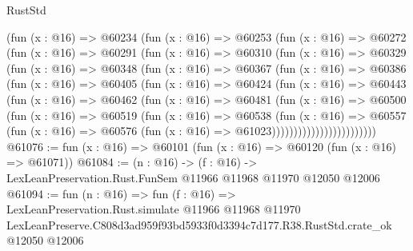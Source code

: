 \begin{lexlean}{RustStd}
\begin{coremodule}
            (fun (x : @16) =>
            @60234
              (fun (x : @16) =>
              @60253
                (fun (x : @16) =>
                @60272
                  (fun (x : @16) =>
                  @60291
                    (fun (x : @16) =>
                    @60310
                      (fun (x : @16) =>
                      @60329
                        (fun (x : @16) =>
                        @60348
                          (fun (x : @16) =>
                          @60367
                            (fun (x : @16) =>
                            @60386
                              (fun (x : @16) =>
                              @60405
                                (fun (x : @16) =>
                                @60424
                                  (fun (x : @16) =>
                                  @60443
                                    (fun (x : @16) =>
                                    @60462
                                      (fun (x : @16) =>
                                      @60481
                                        (fun (x : @16) =>
                                        @60500
                                          (fun (x : @16) =>
                                          @60519
                                            (fun (x : @16) =>
                                            @60538
                                              (fun (x : @16) =>
                                              @60557
                                                (fun (x : @16) =>
                                                @60576
                                                  (fun (x : @16) => @61023))))))))))))))))))))))))
@61076 := fun (x : @16) => @60101 (fun (x : @16) => @60120 (fun (x : @16) => @61071))
@61084 := (n : @16) ->
  (f : @16) -> LexLeanPreservation.Rust.FunSem @11966 @11968 @11970 @12050 @12006
@61094 := fun (n : @16) =>
  fun (f : @16) =>
  LexLeanPreservation.Rust.simulate
    @11966
    @11968
    @11970
    LexLeanPreserve.C808d3ad959f93bd5933f0d3394c7d177.R38.RustStd.crate_ok
    @12050
    @12006
\end{coremodule}
\end{lexlean}

